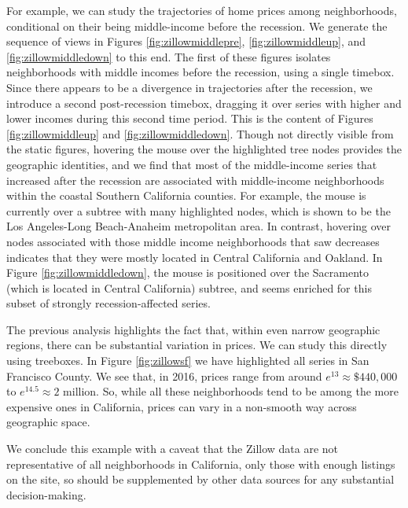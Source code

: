 For example, we can study the trajectories of home prices among neighborhoods,
conditional on their being middle-income before the recession. We generate the
sequence of views in Figures \ref{fig:zillowmiddlepre},
\ref{fig:zillowmiddleup}, and \ref{fig:zillowmiddledown} to this end. The first
of these figures isolates neighborhoods with middle incomes before the
recession, using a single timebox. Since there appears to be a divergence in
trajectories after the recession, we introduce a second post-recession timebox,
dragging it over series with higher and lower incomes during this second time
period. This is the content of Figures \ref{fig:zillowmiddleup} and
\ref{fig:zillowmiddledown}. Though not directly visible from the static figures,
hovering the mouse over the highlighted tree nodes provides the geographic
identities, and we find that most of the middle-income series that increased
after the recession are associated with middle-income neighborhoods within the
coastal Southern California counties. For example, the mouse is currently over a
subtree with many highlighted nodes, which is shown to be the Los Angeles-Long
Beach-Anaheim metropolitan area. In contrast, hovering over nodes associated
with those middle income neighborhoods that saw decreases indicates that they
were mostly located in Central California and Oakland. In Figure
\ref{fig:zillowmiddledown}, the mouse is positioned over the Sacramento (which
is located in Central California) subtree, and seems enriched for this subset of
strongly recession-affected series.

The previous analysis highlights the fact that, within even narrow geographic
regions, there can be substantial variation in prices. We can study this
directly using treeboxes. In Figure \ref{fig:zillowsf} we have highlighted all
series in San Francisco County. We see that, in 2016, prices range from around
$e^{13} \approx \$440,000$ to $e^{14.5} \approx 2 \text{ million}$. So,
while all these neighborhoods tend to be among the more expensive ones in
California, prices can vary in a non-smooth way across geographic space.

We conclude this example with a caveat that the Zillow data are not
representative of all neighborhoods in California, only those with enough
listings on the site, so should be supplemented by other data sources for any
substantial decision-making.

